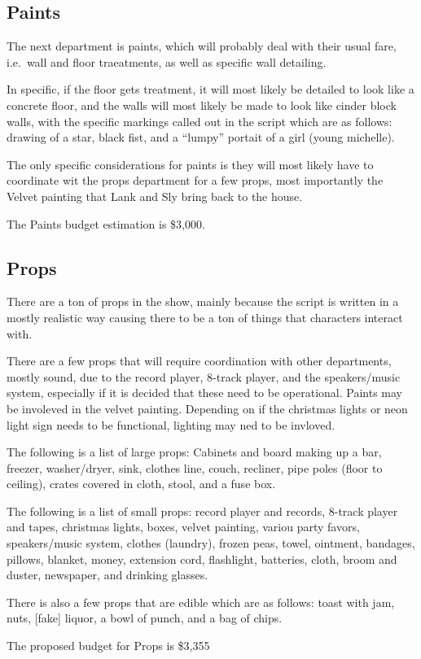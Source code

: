 \documentclass[12pt]{article}
\begin{document}
\begin{doublespace}
\subsection*{Paints}
    \par The next department is paints, which will probably deal with their usual fare, i.e.\ wall and floor traeatments, as well as specific wall detailing.
    \par In specific, if the floor gets treatment, it will most likely be detailed to look like a concrete floor, and the walls will most likely be made to look like cinder block walls, with the specific markings called out in the script which are as follows: drawing of a star, black fist, and a ``lumpy'' portait of a girl (young michelle).
    \par The only specific considerations for paints is they will most likely have to coordinate wit the props department for a few props, most importantly the Velvet painting that Lank and Sly bring back to the house.
    \par The Paints budget estimation is \$3,000.
\subsection*{Props}
    \par There are a ton of props in the show, mainly because the script is written in a mostly realistic way causing there to be a ton of things that characters interact with. 
    \par There are a few props that will require coordination with other departments, mostly sound, due to the record player, 8-track player, and the speakers/music system, especially if it is decided that these need to be operational. Paints may be involeved in the velvet painting. Depending on if the christmas lights or neon light sign needs to be functional, lighting may ned to be invloved.
    \par The following is a list of large props: Cabinets and board making up a bar, freezer, washer/dryer, sink, clothes line, couch, recliner, pipe poles (floor to ceiling), crates covered in cloth, stool, and a fuse box.
    \par The following is a list of small props: record player and records, 8-track player and tapes, christmas lights, boxes, velvet painting, variou party favors, speakers/music system, clothes (laundry), frozen peas, towel, ointment, bandages, pillows, blanket, money, extension cord, flashlight, batteries, cloth, broom and duster, newspaper, and drinking glasses.
    \par There is also a few props that are edible which are as follows: toast with jam, nuts, [fake] liquor, a bowl of punch, and a bag of chips.
    \par The proposed budget for Props is \$3,355

\end{doublespace}
\end{document}
